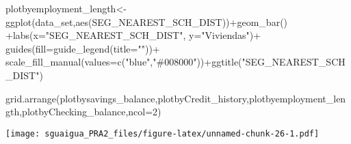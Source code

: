 \documentclass[
]{article}
\newenvironment{Shaded}{\begin{snugshade}}{\end{snugshade}}
\newcommand{\AttributeTok}[1]{\textcolor[rgb]{0.77,0.63,0.00}{#1}}
\newcommand{\DecValTok}[1]{\textcolor[rgb]{0.00,0.00,0.81}{#1}}
\newcommand{\FunctionTok}[1]{\textcolor[rgb]{0.00,0.00,0.00}{#1}}
\newcommand{\NormalTok}[1]{#1}
\newcommand{\OtherTok}[1]{\textcolor[rgb]{0.56,0.35,0.01}{#1}}
\newcommand{\SpecialCharTok}[1]{\textcolor[rgb]{0.00,0.00,0.00}{#1}}
\newcommand{\StringTok}[1]{\textcolor[rgb]{0.31,0.60,0.02}{#1}}
\begin{document}
\begin{Shaded}
\begin{Highlighting}[]
\NormalTok{plotbyemployment\_length}\OtherTok{\textless{}{-}}\FunctionTok{ggplot}\NormalTok{(data\_set,}\FunctionTok{aes}\NormalTok{(SEG\_NEAREST\_SCH\_DIST))}\SpecialCharTok{+}\FunctionTok{geom\_bar}\NormalTok{() }\SpecialCharTok{+}\FunctionTok{labs}\NormalTok{(}\AttributeTok{x=}\StringTok{"SEG\_NEAREST\_SCH\_DIST"}\NormalTok{, }\AttributeTok{y=}\StringTok{"Viviendas"}\NormalTok{)}\SpecialCharTok{+} \FunctionTok{guides}\NormalTok{(}\AttributeTok{fill=}\FunctionTok{guide\_legend}\NormalTok{(}\AttributeTok{title=}\StringTok{""}\NormalTok{))}\SpecialCharTok{+} \FunctionTok{scale\_fill\_manual}\NormalTok{(}\AttributeTok{values=}\FunctionTok{c}\NormalTok{(}\StringTok{"blue"}\NormalTok{,}\StringTok{"\#008000"}\NormalTok{))}\SpecialCharTok{+}\FunctionTok{ggtitle}\NormalTok{(}\StringTok{"SEG\_NEAREST\_SCH\_DIST"}\NormalTok{)}

\FunctionTok{grid.arrange}\NormalTok{(plotbysavings\_balance,plotbyCredit\_history,plotbyemployment\_length,plotbyChecking\_balance,}\AttributeTok{ncol=}\DecValTok{2}\NormalTok{)}
\end{Highlighting}
\end{Shaded}

\texttt{[image: sguaigua\_PRA2\_files/figure-latex/unnamed-chunk-26-1.pdf]}
\end{document}
